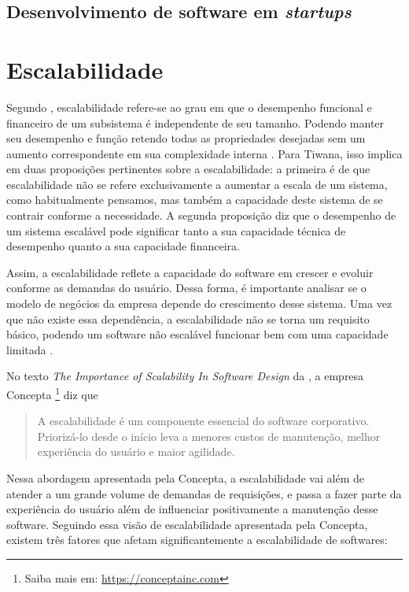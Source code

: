 \subsection{Desenvolvimento de software em \textit{startups}}

\section{Escalabilidade}

Segundo , escalabilidade refere-se ao grau em que
o desempenho funcional e financeiro de um subsistema é independente de seu tamanho.
Podendo manter seu desempenho e função retendo todas as propriedades desejadas sem
um aumento correspondente em sua complexidade interna
. Para Tiwana, isso implica em duas
proposições pertinentes sobre a escalabilidade: a primeira é de que escalabilidade não
se refere exclusivamente a aumentar a escala de um sistema, como habitualmente
pensamos, mas também a capacidade deste sistema de se contrair conforme a necessidade.
A segunda proposição diz que o desempenho de um sistema escalável pode significar
tanto a sua capacidade técnica de desempenho quanto a sua capacidade financeira.

Assim, a escalabilidade reflete a capacidade do software em crescer e evoluir
conforme as demandas do usuário. Dessa forma, é importante analisar se o
modelo de negócios da empresa depende do crescimento desse sistema. Uma vez que
não existe essa dependência, a escalabilidade não se torna um requisito básico,
podendo um software não escalável funcionar bem com uma capacidade limitada
\cite{ConceptaScalability}.

No texto \textit{The Importance of Scalability In Software Design}
da , a empresa Concepta
\footnote{Saiba mais em: \url{https://conceptainc.com}} diz que \begin{quote}
A escalabilidade é um componente essencial do software corporativo. Priorizá-lo
desde o início leva a menores custos de manutenção, melhor experiência do usuário
e maior agilidade.\end{quote} Nessa abordagem apresentada pela Concepta, a
escalabilidade vai além de atender a um grande volume de demandas de requisições,
e passa a fazer parte da experiência do usuário além de influenciar positivamente a
manutenção desse software. Seguindo essa visão de escalabilidade apresentada pela
Concepta, existem três fatores que afetam significantemente a escalabilidade de
softwares:

